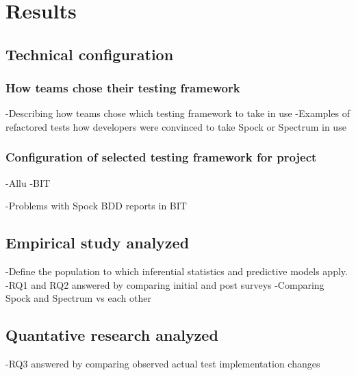 \chapter{Results}
\label{chapter:results}

\section{Technical configuration}
\subsection{How teams chose their testing framework}
    -Describing how teams chose which testing framework to take in use\newline
    -Examples of refactored tests how developers were convinced to take Spock or Spectrum in use\newline
\subsection{Configuration of selected testing framework for project}
    -Allu\newline
    -BIT

    -Problems with Spock BDD reports in BIT\newline


\section{Empirical study analyzed}
-Define the population to which inferential statistics and predictive models apply.\newline
-RQ1 and RQ2 answered by comparing initial and post surveys\newline
-Comparing Spock and Spectrum vs each other\newline

\section{Quantative research analyzed}
-RQ3 answered by comparing observed actual test implementation changes\newline


